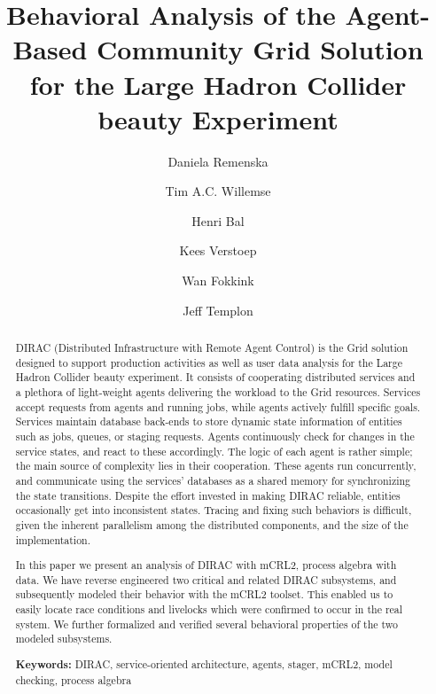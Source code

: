 \documentclass[10pt,conference]{IEEEtran}
\begin{document}
\title{Behavioral Analysis of the Agent-Based Community Grid Solution for the Large Hadron Collider beauty Experiment}
\author[1,3]{Daniela Remenska}
\author[2]{Tim A.C. Willemse}
\author[1]{Henri Bal}
\author[1]{Kees Verstoep}
\author[1]{Wan Fokkink}
\author[3]{Jeff Templon}


\maketitle

\begin{abstract}
DIRAC (Distributed Infrastructure with Remote Agent Control) is the Grid
solution designed to support production activities as well as user data analysis
for the Large Hadron Collider beauty experiment. It consists of cooperating
distributed services and a plethora of light-weight agents delivering the
workload to the Grid resources.  Services accept requests from agents and
running jobs, while agents actively fulfill specific goals. Services maintain
database back-ends to store dynamic state information of entities such as jobs,
queues, or staging requests. Agents continuously check for changes in the
service states, and react to these accordingly. The logic of each agent is
rather simple; the main source of complexity lies in their cooperation. These
agents run concurrently, and communicate using the services' databases as a
shared memory for synchronizing the state transitions. Despite the effort
invested in making DIRAC reliable, entities occasionally get into inconsistent
states. Tracing and fixing such behaviors is difficult, given the inherent
parallelism among the distributed components, and the size of the
implementation.

In this paper we present an analysis of DIRAC with mCRL2, process algebra with
data. We have reverse engineered two critical and related DIRAC subsystems, and
subsequently modeled their behavior with the mCRL2 toolset. This enabled us to
easily locate race conditions and livelocks which were confirmed to occur in the
real system. We further formalized and verified several behavioral properties of
the two modeled subsystems.

\textbf{Keywords:} DIRAC, service-oriented architecture, agents, stager,
mCRL2,  model checking,  process algebra

\end{abstract}
\end{document}
